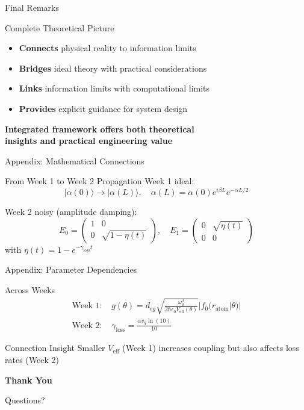 \documentclass{beamer}
\theoremstyle{definition}
\theoremstyle{plain}
\begin{document}
\begin{frame}{Final Remarks}
    \begin{block}{Complete Theoretical Picture}
        \begin{itemize}
            \item \textbf{Connects} physical reality to information limits
            \item \textbf{Bridges} ideal theory with practical considerations
            \item \textbf{Links} information limits with computational limits
            \item \textbf{Provides} explicit guidance for system design
        \end{itemize}
    \end{block}
    
    \vspace{0.5cm}
    
    \centering
    \Large
    \textbf{Integrated framework offers both theoretical \\ insights and practical engineering value}
\end{frame}

\appendix
\begin{frame}{Appendix: Mathematical Connections}
    \begin{block}{From Week 1 to Week 2 Propagation}
        Week 1 ideal:
        \[
        |\alpha(0)\rangle \to |\alpha(L)\rangle, \quad \alpha(L) = \alpha(0)e^{i\beta L}e^{-\alpha L/2}
        \]
        
        Week 2 noisy (amplitude damping):
        \[
        E_0 = \begin{pmatrix} 1 & 0 \\ 0 & \sqrt{1-\eta(t)} \end{pmatrix}, \quad E_1 = \begin{pmatrix} 0 & \sqrt{\eta(t)} \\ 0 & 0 \end{pmatrix}
        \]
        with $\eta(t) = 1 - e^{-\gamma_{\text{loss}}t}$
    \end{block}
\end{frame}

\begin{frame}{Appendix: Parameter Dependencies}
    \begin{block}{Across Weeks}
        \small
        \begin{align*}
            \text{Week 1: } & g(\theta) = d_{eg}\sqrt{\frac{\omega_0^3}{2\hbar\epsilon_0 V_{\text{eff}}(\theta)}} |f_0(r_{\text{atom}}|\theta)| \\
            \text{Week 2: } & \gamma_{\text{loss}} = \frac{\alpha v_g \ln(10)}{10}
        \end{align*}
    \end{block}
    
    \begin{block}{Connection Insight}
        Smaller $V_{\text{eff}}$ (Week 1) increases coupling but also affects loss rates (Week 2)
    \end{block}
\end{frame}

\begin{frame}
    \centering
    \Huge
    \textbf{Thank You}
    
    \vspace{1cm}
    
    \large
    Questions?
\end{frame}
\end{document}
